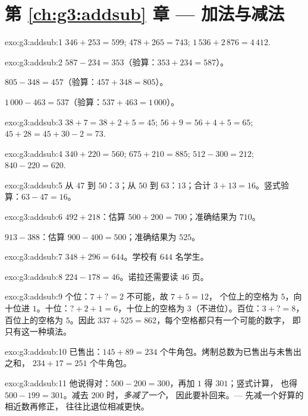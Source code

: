 \section*{第 \ref{ch:g3:addsub} 章 --- 加法与减法}

\begin{solution}{exo:g3:addsub:1}
$346 + 253 = 599$; \quad
$478 + 265 = 743$; \quad
$1\,536 + 2\,876 = 4\,412$.
\end{solution}

\begin{solution}{exo:g3:addsub:2}
$587 - 234 = 353$（验算：$353 + 234 = 587$）。

$805 - 348 = 457$（验算：$457 + 348 = 805$）。

$1\,000 - 463 = 537$（验算：$537 + 463 = 1\,000$）。
\end{solution}

\begin{solution}{exo:g3:addsub:3}
$38 + 7 = 38 + 2 + 5 = 45$; \quad
$56 + 9 = 56 + 4 + 5 = 65$; \quad
$45 + 28 = 45 + 30 - 2 = 73$.
\end{solution}

\begin{solution}{exo:g3:addsub:4}
$340 + 220 = 560$; \quad $675 + 210 = 885$; \quad
$512 - 300 = 212$; \quad $840 - 220 = 620$.
\end{solution}

\begin{solution}{exo:g3:addsub:5}
从 $47$ 到 $50$：$3$；从 $50$ 到 $63$：$13$；合计
$3 + 13 = 16$。竖式验算：$63 - 47 = 16$。
\end{solution}

\begin{solution}{exo:g3:addsub:6}
$492 + 218$：估算 $500 + 200 = 700$；准确结果为 $710$。

$913 - 388$：估算 $900 - 400 = 500$；准确结果为 $525$。
\end{solution}

\begin{solution}{exo:g3:addsub:7}
$348 + 296 = 644$。学校有 $644$ 名学生。
\end{solution}

\begin{solution}{exo:g3:addsub:8}
$224 - 178 = 46$。诺拉还需要读 $46$ 页。
\end{solution}

\begin{solution}{exo:g3:addsub:9}
个位：$7 + \text{?} = 2$ 不可能，故 $7 + 5 = 12$，
个位上的空格为 $5$，向十位进 $1$。十位：$\text{?} + 2 + 1 = 6$，十位上的空格为
$3$（不进位）。百位：$3 + \text{?} = 8$，百位上的空格为
$5$。因此 $337 + 525 = 862$，每个空格都只有一个可能的数字，
即只有这一种填法。
\end{solution}

\begin{solution}{exo:g3:addsub:10}
已售出：$145 + 89 = 234$ 个牛角包。烤制总数为已售出与未售出之和，
$234 + 17 = 251$ 个牛角包。
\end{solution}

\begin{solution}{exo:g3:addsub:11}
他说得对：$500 - 200 = 300$，再加 $1$ 得 $301$；竖式计算，
也得 $500 - 199 = 301$。减去 $200$ 时，\emph{多减了一个}，
因此要补回来。--- 先减一个好算的相近数再修正，
往往比退位相减更快。
\end{solution}
